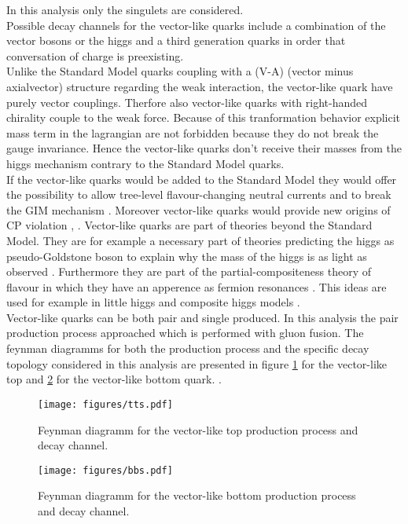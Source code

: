 In this analysis only the singulets are considered.\\
Possible decay channels for the vector-like quarks include a combination of the vector bosons or the higgs and a third generation quarks in order that conversation of charge is preexisting.\\
Unlike the Standard Model quarks coupling with a (V-A) (vector minus axialvector) structure regarding the weak interaction, the vector-like quark have purely vector couplings.
Therfore also vector-like quarks with right-handed chirality couple to the weak force.
Because of this tranformation behavior explicit mass term in the lagrangian are not forbidden because they do not break the gauge invariance.
Hence the vector-like quarks don't receive their masses from the higgs mechanism contrary to the Standard Model quarks.\\
If the vector-like quarks would be added to the Standard Model they would offer the possibility to allow tree-level flavour-changing neutral currents and to break the GIM mechanism \cite{GIM}.
Moreover vector-like quarks would provide new origins of CP violation \cite{CP1}, \cite{CP2}.
Vector-like quarks are part of  theories beyond the Standard Model. 
They are for example a necessary part of theories predicting the higgs as pseudo-Goldstone boson to explain why the mass of the higgs is as light as observed \cite{Th1-Th3}. 
Furthermore they are part of the partial-compositeness theory of flavour in which they have an apperence as fermion resonances \cite{Th4,Th5}.
This ideas are used for example in little higgs and composite higgs models .\\
Vector-like quarks can be both pair and single produced.
In this analysis the pair production process approached which is performed with gluon fusion.
The feynman diagramms for both the production process and the specific decay topology considered in this analysis are presented in figure \ref{feynmantts} for the vector-like top and \ref{feynmanbbs} for the vector-like bottom quark. .

\begin{figure}[h!]
\centering
\texttt{[image: figures/tts.pdf]}
\caption{Feynman diagramm for the vector-like top production process and decay channel.}
\label{feynmantts}
\end{figure}

\newpage

\begin{figure}[h!]
\centering
\texttt{[image: figures/bbs.pdf]}
\caption{Feynman diagramm for the vector-like bottom production process and decay channel.}
\label{feynmanbbs}
\end{figure}


